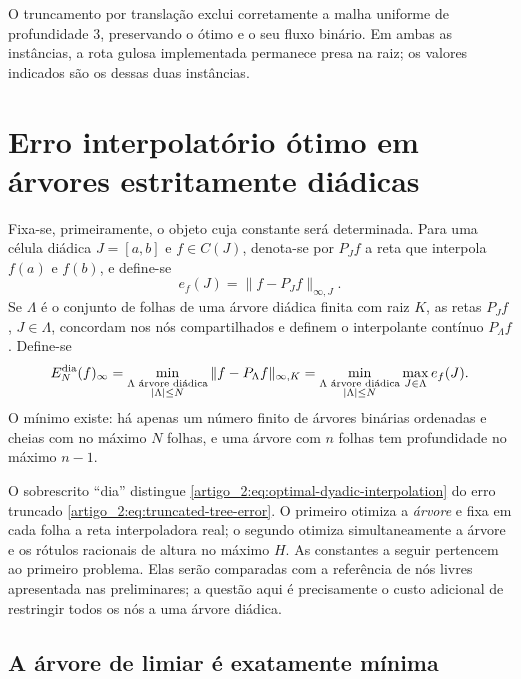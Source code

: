 O truncamento por translação exclui corretamente a malha uniforme de
profundidade $3$, preservando o ótimo e o seu fluxo binário. Em ambas as
instâncias, a rota gulosa implementada permanece presa na raiz; os valores indicados são os dessas duas instâncias.

\section{Erro interpolatório ótimo em árvores estritamente diádicas}
\label{artigo_2:sec:dyadic-asymptotic}

Fixa-se, primeiramente, o objeto cuja constante será determinada. Para uma célula
diádica $J=[a,b]$ e $f\in C(J)$, denota-se por $P_Jf$ a reta que interpola
$f(a)$ e $f(b)$, e define-se
\begin{equation}
 e_f(J)=\|f-P_Jf\|_{\infty,J}.
 \label{artigo_2:eq:local-interpolation-error}
\end{equation}
Se $\Lambda$ é o conjunto de folhas de uma árvore diádica finita com raiz
$K$, as retas $P_Jf$, $J\in\Lambda$, concordam nos nós compartilhados e
definem o interpolante contínuo $P_\Lambda f$. Define-se
\begin{equation}
 E_N^{\rm dia}(f)_\infty
 =\min_{\substack{\Lambda\text{ árvore diádica}\\ |\Lambda|\le N}}
   \|f-P_\Lambda f\|_{\infty,K}
 =\min_{\substack{\Lambda\text{ árvore diádica}\\ |\Lambda|\le N}}
   \max_{J\in\Lambda}e_f(J).
 \label{artigo_2:eq:optimal-dyadic-interpolation}
\end{equation}
O mínimo existe: há apenas um número finito de árvores binárias ordenadas e
cheias com no máximo $N$ folhas, e uma árvore com $n$ folhas tem profundidade
no máximo $n-1$.

O sobrescrito ``dia'' distingue \eqref{artigo_2:eq:optimal-dyadic-interpolation} do
erro truncado \eqref{artigo_2:eq:truncated-tree-error}. O primeiro otimiza a
\emph{árvore} e fixa em cada folha a reta interpoladora real; o segundo
otimiza simultaneamente a árvore e os rótulos racionais de altura no máximo $H$.
As constantes a seguir pertencem ao primeiro problema.
Elas serão comparadas com a referência de nós livres apresentada nas preliminares; a questão aqui é precisamente o custo adicional de
restringir todos os nós a uma árvore diádica.

\subsection{A árvore de limiar é exatamente mínima}

